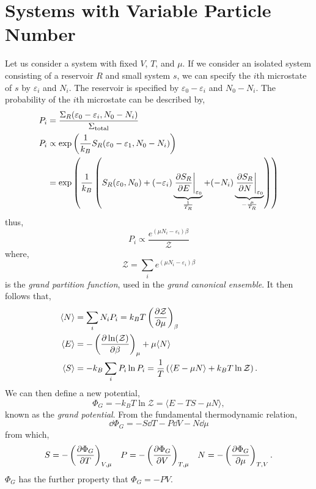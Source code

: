 \documentclass{book}
\begin{document}
\section{Systems with Variable Particle Number}
Let us consider a system with fixed $V$, $T$, and $\mu$. If we consider an isolated system consisting of a reservoir $R$ and small system $s$, we can specify the $i$th microstate of $s$ by $\varepsilon_i$ and $N_i$. The reservoir is specified by $\varepsilon_0 - \varepsilon_i$ and $N_0 - N_i$. The probability of the $i$th microstate can be described by,
\begin{equation}
	\begin{split}
		P_i & = \frac{\Sigma_R(\varepsilon_0-\varepsilon_i,N_0 -N_i)}{\Sigma_{\text{total}}} \\
		P_i & \propto \exp\left(\frac{1}{k_B}S_R(\varepsilon_0 - \varepsilon_1, N_0 - N_i)\right) \\
		& = \exp\left(\frac{1}{k_B}\left(S_R(\varepsilon_0, N_0) + (-\varepsilon_i)\underbrace{\eval{\pdv{S_R}{E}}_{\varepsilon_0}}_{\frac{1}{T_R}} + (-N_i)\underbrace{\eval{\pdv{S_R}{N}}_{\varepsilon_0}}_{-\frac{\mu}{T_R}}\right)\right)
	\end{split}
\end{equation}
thus,
\begin{equation}
	P_i \propto \frac{e^{(\mu N_i - \varepsilon_i)\beta}}{\mathcal{Z}}
\end{equation}
where,
\begin{equation}
	\mathcal{Z} = \sum_ie^{(\mu N_i - \varepsilon_i)\beta}
\end{equation}
is the \textit{grand partition function}, used in the \textit{grand canonical ensemble}. It then follows that,
\begin{align}
	\langle N \rangle &= \sum_iN_iP_i = k_BT\left(\pdv{\mathcal{Z}}{\mu}\right)_{\beta} \\
	\langle E \rangle & = -\left(\pdv{\ln(\mathcal{Z})}{\beta}\right)_{\mu} + \mu\langle N \rangle  \\
	\langle S \rangle & = -k_B\sum_iP_i\ln P_i = \frac{1}{T}\left(\langle E - \mu N\rangle + k_BT\ln\mathcal{Z}\right).
\end{align}
We can then define a new potential,
\begin{equation}
	\Phi_G = -k_BT\ln\mathcal{Z} = \langle E - TS - \mu N\rangle,
\end{equation}
known as the \textit{grand potential}. From the fundamental thermodynamic relation, \begin{equation}
	\dd\Phi_G = -S\dd{T} - P\dd{V} - N \dd\mu 
\end{equation}
from which,
\begin{align}
	S = -\left( \pdv{\Phi_G}{T}\right)_{V,\mu} && P = -\left(\pdv{\Phi_G}{V}\right)_{T,\mu} && N = - \left(\pdv{\Phi_G}{\mu}\right)_{T, V}.
\end{align}
$\Phi_G$ has the further property that $\Phi_G = -PV$. 
\end{document}
